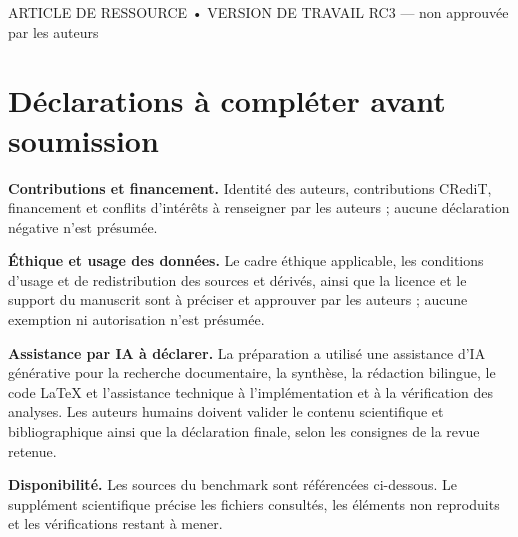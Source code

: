 \documentclass[10pt,a4paper]{article}
\begin{document}
\thispagestyle{empty}
\begin{center}
{\small ARTICLE DE RESSOURCE • VERSION DE TRAVAIL RC3 — non approuvée par les auteurs\par}
\vspace{10pt}
{\LARGE\bfseries\PaperTitle\par}
\vspace{12pt}
{\normalsize\PaperAuthors\par}
\vspace{3pt}
{\small\itshape\PaperAffiliation\par}
\end{center}
\vspace{8pt}
\begin{abstract}

\end{abstract}
\vspace{10pt}

\section*{Déclarations à compléter avant soumission}
\noindent\textbf{Contributions et financement.} Identité des auteurs, contributions CRediT, financement et conflits d'intérêts à renseigner par les auteurs ; aucune déclaration négative n'est présumée.\par
\noindent\textbf{Éthique et usage des données.} Le cadre éthique applicable, les conditions d'usage et de redistribution des sources et dérivés, ainsi que la licence et le support du manuscrit sont à préciser et approuver par les auteurs ; aucune exemption ni autorisation n'est présumée.\par
\noindent\textbf{Assistance par IA à déclarer.} La préparation a utilisé une assistance d'IA générative pour la recherche documentaire, la synthèse, la rédaction bilingue, le code LaTeX et l'assistance technique à l'implémentation et à la vérification des analyses. Les auteurs humains doivent valider le contenu scientifique et bibliographique ainsi que la déclaration finale, selon les consignes de la revue retenue.\par
\noindent\textbf{Disponibilité.} Les sources du benchmark sont référencées ci-dessous. Le supplément scientifique précise les fichiers consultés, les éléments non reproduits et les vérifications restant à mener.


\end{document}
